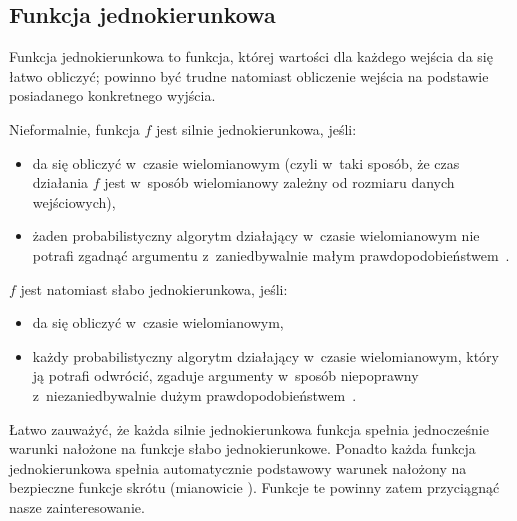 \subsection{Funkcja jednokierunkowa}
Funkcja jednokierunkowa to funkcja, której wartości dla każdego wejścia da się
łatwo obliczyć; powinno być trudne natomiast obliczenie wejścia na podstawie
posiadanego konkretnego wyjścia.

\noindent Nieformalnie, funkcja $f$ jest silnie jednokierunkowa, jeśli:

\begin{itemize}

    \item da się obliczyć w~czasie wielomianowym (czyli w~taki sposób, że czas
    działania $f$ jest w~sposób wielomianowy zależny od rozmiaru danych
    wejściowych),

    \item żaden probabilistyczny algorytm działający w~czasie wielomianowym nie
    potrafi zgadnąć argumentu z~zaniedbywalnie małym
    prawdopodobieństwem~\cite{one_way_functions}.

\end{itemize}

\noindent $f$ jest natomiast słabo jednokierunkowa, jeśli:

\begin{itemize}

    \item da się obliczyć w~czasie wielomianowym,

    \item każdy probabilistyczny algorytm działający w~czasie wielomianowym,
    który ją potrafi odwrócić, zgaduje argumenty w~sposób niepoprawny
    z~niezaniedbywalnie dużym prawdopodobieństwem~\cite{one_way_functions}.

\end{itemize}

Łatwo zauważyć, że każda silnie jednokierunkowa funkcja spełnia jednocześnie
warunki nałożone na funkcje słabo jednokierunkowe. Ponadto każda funkcja
jednokierunkowa spełnia automatycznie podstawowy warunek nałożony na bezpieczne
funkcje skrótu (mianowicie ). Funkcje te
powinny zatem przyciągnąć nasze zainteresowanie.



